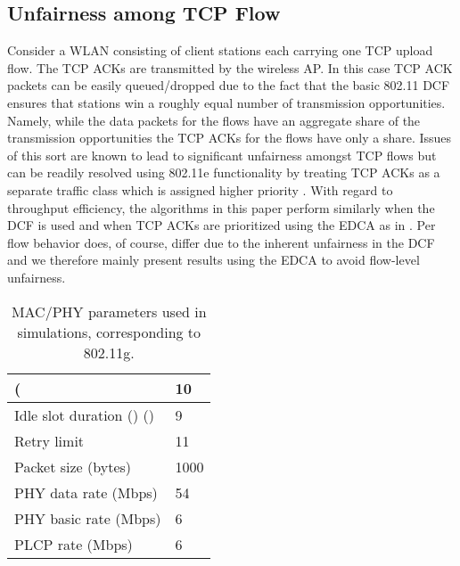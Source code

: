 \documentclass[10pt,twocolumn, journal]{IEEEtran}
\begin{document}
\subsection{Unfairness among TCP Flow}\label{subsec_tcp_unfairness}
Consider a WLAN consisting of  client stations each carrying one TCP upload flow.  The TCP ACKs are transmitted by the wireless AP.  In this case TCP ACK packets can be easily queued/dropped due to the fact that the basic 802.11 DCF ensures that stations win a roughly equal number of transmission opportunities.   Namely, while the data packets for the  flows have an aggregate  share of the transmission opportunities the TCP ACKs for the  flows have only a  share.   Issues of this sort are known to lead to significant unfairness amongst TCP flows but can be readily resolved using 802.11e functionality by treating TCP ACKs as a separate traffic class which is assigned higher priority \cite{Leith_CommLetter_2005}.   With regard to throughput efficiency, the algorithms in this paper perform similarly when the DCF is used and when TCP ACKs are prioritized using the EDCA as in \cite{Leith_CommLetter_2005}.   Per flow behavior does, of course, differ due to the inherent unfairness in the DCF and we therefore mainly present results using the EDCA to avoid flow-level unfairness.


\begin{table}[tb]
\centering
                    \begin{tabular}[b]{|l|l|}\hline
                         (  & 10  \\
                        \hline
                        Idle slot duration () () & 9  \\
                        \hline
                        Retry limit  & 11 \\
                        \hline
                        Packet size (bytes)    & 1000 \\
                        \hline
                        PHY data rate (Mbps)   & 54 \\
                        \hline
                        PHY basic rate (Mbps)  & 6 \\
                        \hline
                        PLCP rate (Mbps)  & 6 \\
                        \hline
                    \end{tabular}
                \caption{MAC/PHY parameters used in simulations, corresponding to 802.11g.}
                \label{parameters_buffersizing}
\end{table}
\end{document}
